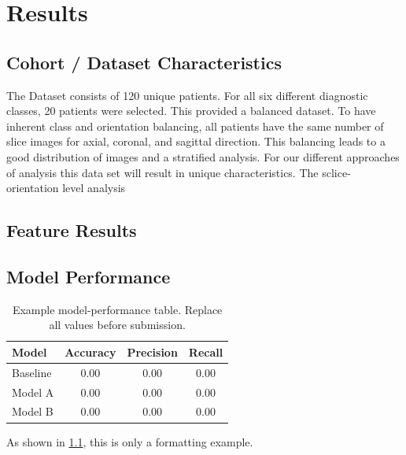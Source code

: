\chapter{Results}
\label{chap:results}

\section{Cohort / Dataset Characteristics}
\label{sec:cohort}

The Dataset consists of 120 unique patients. For all six different diagnostic classes, 
20 patients were selected. This provided a balanced dataset. To have inherent class and orientation balancing, all patients 
have the same number of slice images for axial, coronal, and sagittal  direction. This balancing leads to a good distribution 
of images and a stratified analysis. 
For our different approaches of analysis this data set will result in unique characteristics. The sclice-orientation level 
analysis 
\section{Feature Results}
\label{sec:feature-results}




\section{Model Performance}
\label{sec:model-performance}



\begin{table}[htbp]
    \centering
    \caption{Example model-performance table. Replace all values before submission.}
    \label{tab:example-performance}
    \begin{tabular}{lccc}
        \toprule
        Model & Accuracy & Precision & Recall \\
        \midrule
        Baseline & 0.00 & 0.00 & 0.00 \\
        Model A & 0.00 & 0.00 & 0.00 \\
        Model B & 0.00 & 0.00 & 0.00 \\
        \bottomrule
    \end{tabular}
\end{table}

As shown in \cref{tab:example-performance}, this is only a formatting example.
